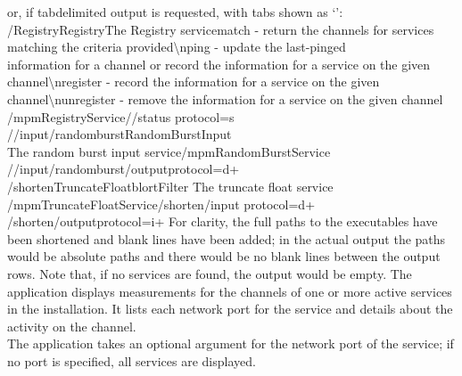 \outputEnd{}
or, if tab\longDash{}delimited output is requested, with tabs shown as `\tabSymbol':
\outputBegin{}
/\dollarService\pseudotab{}Registry\pseudotab{}Registry\pseudotab\pseudotab{}The Registry
service\pseudotab{}match - return the channels for services matching the criteria
provided\textbackslash{}nping - update the last-pinged\\
information for a channel or record the information for a service on the given\\
channel\textbackslash{}nregister - record the information for a service on the given\\
channel\textbackslash{}nunregister - remove the information for a service on the given
channel\pseudotab\\
\textellipsis/mpmRegistryService\pseudotwotabs/\dollarService/status\textbraceleft{}%
protocol=s\textbraceright\\

/\serviceName/input/randomburst\pseudotab{}RandomBurst\pseudotab\pseudotab{}Input
\pseudotab\\
The random burst input service\pseudotwotabs\textellipsis/mpmRandomBurstService%
\pseudotwotabs\\
/\serviceName/input/randomburst/output\textbraceleft{}protocol=d+\textbraceright\\

/shorten\pseudotab{}TruncateFloat\pseudotab{}blort\pseudotab{}Filter\pseudotab{}%
The truncate float service\pseudotwotabs\\
\textellipsis/mpmTruncateFloatService\pseudotab{}/shorten/input\textbraceleft{}%
protocol=d+\textbraceright\pseudotab\\
/shorten/output\textbraceleft{}protocol=i+\textbraceright
\outputEnd{}
For clarity, the full paths to the executables have been shortened and blank lines have
been added; in the actual output the paths would be absolute paths and there would be no
blank lines between the output rows.
Note that, if no services are found, the output would be empty.
\condPage
{}
The application  displays measurements for the channels of
one or more active services in the \mplusm{} installation.
It lists each \yarp{} network port for the service and details about the activity on the
channel.\\

The application takes an optional argument for the \yarp{} network port of the service;
if no port is specified, all services are displayed.
\insertFullUtilityParameters\\

